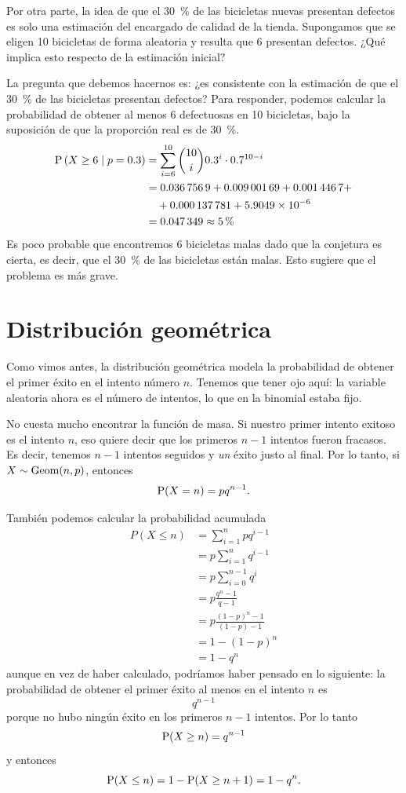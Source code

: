 Por otra parte, la idea de que el \qty{30}{\percent} de las bicicletas nuevas presentan defectos es solo una estimación del encargado de calidad de la tienda. 
Supongamos que se eligen 10 bicicletas de forma aleatoria y resulta que 6 presentan defectos. 
¿Qué implica esto respecto de la estimación inicial?

La pregunta que debemos hacernos es: ¿es consistente con la estimación de que el \qty{30}{\percent} de las bicicletas presentan defectos? Para responder, podemos calcular la probabilidad de obtener al menos 6 defectuosas en 10 bicicletas, bajo la suposición de que la proporción real es de \qty{30}{\percent}.
\begin{align*}
\operatorname{P}\left(X\geq6\;\middle|\;p=\num{0,3}\right) &= \sum_{i=6}^{10} \binom{10}{i}\num{0,3}^i\cdot\num{0,7}^{10-i}\\
&= \num{0.0367569} + \num{0.00900169} + \num{0.0014467} + \\
&\quad + \num{0.000137781} + \num{5.9049e-6}\\
&= \num{0.047349} \approx \qty{5}{\percent}
\end{align*}
Es poco probable que encontremos 6 bicicletas malas dado que la conjetura es cierta, es decir, que el \qty{30}{\percent} de las bicicletas están malas. Esto sugiere que el problema es más grave.

\section{Distribución geométrica}

Como vimos antes, la distribución geométrica modela la probabilidad de obtener el primer éxito en el intento número \(n\). Tenemos que tener ojo aquí: la variable aleatoria ahora es el número de intentos, lo que en la binomial estaba fijo. 

No cuesta mucho encontrar la función de masa. Si nuestro primer intento exitoso es el intento \(n\), eso quiere decir que los primeros \(n-1\) intentos fueron fracasos. Es decir, tenemos \(n-1\) intentos seguidos y \emph{un} éxito justo al final. Por lo tanto, si \(X\sim\operatorname{Geom}(n, p)\), entonces \[\operatorname{P}(X=n) = pq^{n-1}.\]

\newpage También podemos calcular la probabilidad acumulada
\begin{align*}
P(X\leq n) &= \sum_{i=1}^{n}p q^{i-1}\\
&= p\sum_{i=1}^{n} q^{i-1}\\
&= p\sum_{i=0}^{n-1}q^{i}\\
&= p \frac{q^n-1}{q-1}\\
&= p \frac{(1-p)^n-1}{(1-p)-1}\\
&=1 - (1 - p)^n\\
&= 1 - q^n
\end{align*}
aunque en vez de haber calculado, podríamos haber pensado en lo siguiente: la probabilidad de obtener el primer éxito al menos en el intento \(n\) es \[q^{n-1}\] porque no hubo ningún éxito en los primeros \(n-1\) intentos. Por lo tanto \[\operatorname{P}(X\geq n) = q^{n-1}\] y entonces \[\operatorname{P}(X\leq n) = 1 - \operatorname{P}(X\geq n+1) = 1 - q^n.\]

